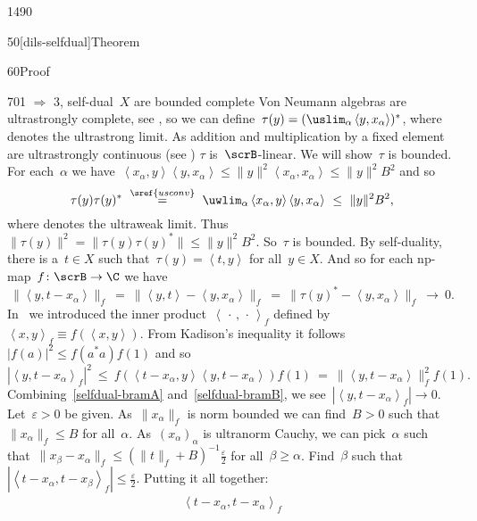 \begin{parsec}{1490}
\begin{point}{50}[dils-selfdual]{Theorem}
\begin{point}{60}{Proof}
\begin{point}{70}{1 $\Rightarrow$ 3, self-dual~$X$ are bounded complete}
Von Neumann algebras are ultrastrongly complete, see ,
so we can define~$\tau(y) = (\uslim_\alpha \left<y, x_\alpha\right>)^*$,
    where~\Define{$\uslim$} denotes
    the ultrastrong limit.
As addition and multiplication by a fixed element
are ultrastrongly continuous (see )
    $\tau$ is~$\scrB$-linear.
We will show~$\tau$ is bounded.
For each~$\alpha$ we have~$\left<x_\alpha, y\right>\left<y, x_\alpha\right>
        \leq \|y\|^2\left<x_\alpha, x_\alpha\right> \leq \|y\|^2B^2$ and so
\begin{equation*}
    \tau(y)\tau(y)^*
    \ \overset{\sref{usconv}}{=} \ 
    \uwlim_\alpha \left<x_\alpha,y\right>\left<y,x_\alpha\right>
    \ \leq \ \|y\|^2B^2,
\end{equation*}
where \Define{$\uwlim$}
    denotes the ultraweak limit.
Thus~$\|\tau(y)\|^2 = \|\tau(y)\tau(y)^*\| \leq \|y\|^2B^2$.
So~$\tau$ is bounded.
By self-duality, there is a~$t \in X$ such that~$\tau(y) = \left<t,y\right>$
for all~$y \in X$.
And so for each np-map~$f\colon \scrB \to \C$ we have
\begin{equation}\label{selfdual-bramA}
    \|\left<y, t-x_\alpha\right>\|_f \ =\ 
    \|\left<y, t\right>-\left<y,x_\alpha\right>\|_f \ =\ 
    \|\tau(y)^*-\left<y,x_\alpha\right>\|_f\  \rightarrow \  0.
\end{equation}
In~\sref{module-innerprod-state}
    we introduced the inner product~$\left<\,\cdot\,,\,\cdot\,\right>_f$
    defined by~$\left<x,y\right>_f \equiv f(\left<x,y\right>)$.
From Kadison's inequality 
it follows~$|f(a)|^2 \leq f(a^*a)f(1)$
and so
\begin{equation}\label{selfdual-bramB}
    |\left<y,t-x_\alpha\right>_f|^2
    \ \leq \ f( \left<t-x_\alpha,y\right> \left<y,t-x_\alpha\right>) f(1)
    \ =\  \| \left<y,t-x_\alpha\right> \|_f^2 f(1).
\end{equation}
Combining~\eqref{selfdual-bramA} and~\eqref{selfdual-bramB},
    we see~$|\left<y,t-x_\alpha\right>_f| \rightarrow 0$.
Let~$\varepsilon > 0$ be given.
As~$\|x_\alpha\|_f$ is norm bounded
we can find~$B > 0$ such that~$\|x_\alpha\|_f \leq B$
for all~$\alpha$.
As~$(x_\alpha)_\alpha$ is ultranorm Cauchy,
we can pick~$\alpha$ such that~$\|x_\beta - x_\alpha\|_f \leq (\|t\|_f + B)^{-1}
\frac{\varepsilon}{2}$ for all~$\beta \geq \alpha$.
Find~$\beta$ such that~$|\left<t-x_\alpha,t-x_\beta\right>_f|
    \leq \frac{\varepsilon}{2}$.
Putting it all together:
\begin{align*}
    \left<t-x_\alpha,t-x_\alpha\right>_f

\end{align*}
\end{point}
\end{point}
\end{point}
\end{parsec}
